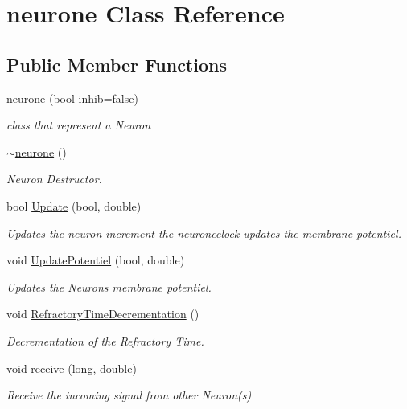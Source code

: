 \hypertarget{classneurone}{}\section{neurone Class Reference}
\label{classneurone}
\subsection*{Public Member Functions}
\begin{DoxyCompactItemize}
\item 
\hyperlink{classneurone_a45317bb4df99f1e79b5dd3d5ca7fe641}{neurone} (bool inhib=false)
\begin{DoxyCompactList}\small\item\em class that represent a Neuron \end{DoxyCompactList}\item 
\hyperlink{classneurone_a88029788e99ac38981e04959a777a227}{$\sim$neurone} ()
\begin{DoxyCompactList}\small\item\em Neuron Destructor. \end{DoxyCompactList}\item 
bool \hyperlink{classneurone_a0d86742f8c3cb66b6e223f5588dd84de}{Update} (bool, double)
\begin{DoxyCompactList}\small\item\em Updates the neuron increment the neuroneclock updates the membrane potentiel. \end{DoxyCompactList}\item 
void \hyperlink{classneurone_a82853256cf518a4539e3ead03d0a0bf6}{Update\+Potentiel} (bool, double)
\begin{DoxyCompactList}\small\item\em Updates the Neuron\textquotesingle{}s membrane potentiel. \end{DoxyCompactList}\item 
void \hyperlink{classneurone_ae24b7ac8addb3cc7b1b08042066576e6}{Refractory\+Time\+Decrementation} ()
\begin{DoxyCompactList}\small\item\em Decrementation of the Refractory Time. \end{DoxyCompactList}\item 
void \hyperlink{classneurone_af1e157df98fa2c15cb70bc50032d39c0}{receive} (long, double)
\begin{DoxyCompactList}\small\item\em Receive the incoming signal from other Neuron(s) \end{DoxyCompactList}\item 

\end{DoxyCompactItemize}
